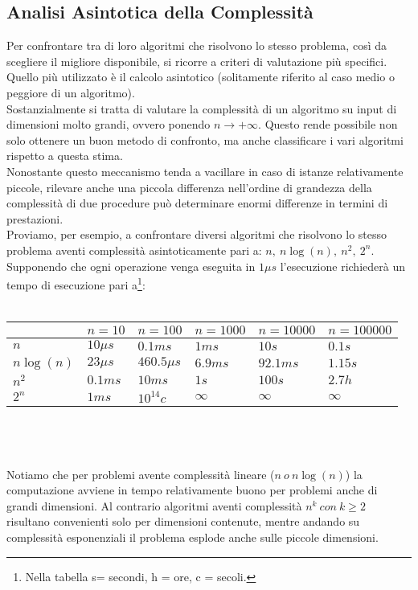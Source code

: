 \subsection{Analisi Asintotica della Complessità}
Per confrontare tra di loro algoritmi che risolvono lo stesso problema, così da scegliere il migliore disponibile, si ricorre a criteri di valutazione più specifici. Quello più utilizzato è il calcolo asintotico (solitamente riferito al caso medio o peggiore di un algoritmo).\\
Sostanzialmente si tratta di valutare la complessità di un algoritmo su input di dimensioni molto grandi, ovvero ponendo $n \rightarrow +\infty$. Questo rende possibile non solo ottenere un buon metodo di confronto, ma anche classificare i vari algoritmi rispetto a questa stima.\\
Nonostante questo meccanismo tenda a vacillare in caso di istanze relativamente piccole, rilevare anche una piccola differenza nell'ordine di grandezza della complessità di due procedure può determinare enormi differenze in termini di prestazioni.\\
Proviamo, per esempio, a confrontare diversi algoritmi che risolvono lo stesso problema aventi complessità asintoticamente pari a: $n, \ n\log(n), \ n^2, \ 2^n$. Supponendo che ogni operazione venga eseguita in $1\mu s$ l'esecuzione richiederà un tempo di esecuzione pari a\footnote{Nella tabella s= secondi, h = ore, c = secoli.}:
\\
\\
\label{my-label}
\begin{tabular}{|l|l|l|l|l|l|}
\hline
			& $n=10$     & $n=100$       	& $n=1000$      & $n=10000$  & $n=100000$  \\   \hline
$n$   		& $10\mu s$  & $0.1 ms$      	&  $1ms$      	& $10s$  	 & $0.1s$      \\	\hline
$n\log(n)$  & $23\mu s$  & $460.5 \mu s$    &  $6.9 ms$     & $92.1 ms$  & $1.15 s$    \\	\hline
$n^2$ 		& $0.1ms$    & $10ms$        	&  $1s$         & $100s$     & $2.7h$      \\	\hline
$2^n$		& $1ms$      & $ 10^{14} c$     &  $\infty$     & $\infty$   & $\infty$    \\   \hline
\end{tabular}
\\ 
\\ 
\\ 
Notiamo che per problemi avente complessità lineare ($n \ o \ n\log(n)$) la computazione avviene in tempo relativamente buono per problemi anche di grandi dimensioni. Al contrario algoritmi aventi complessità $n^k \ con \ k \geq 2 $ risultano convenienti solo per dimensioni contenute, mentre andando su complessità esponenziali il problema esplode anche sulle piccole dimensioni. 
